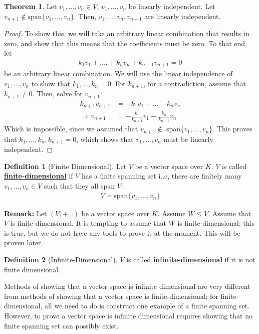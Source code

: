 \documentclass[11pt]{scrartcl}
\theoremstyle{definition}
\newtheorem{theorem}{Theorem}
\newtheorem{definition}{Definition}
\theoremstyle{remark}
\newcommand{\dfn}[1]{\textbf{\underline{#1}}}
\newcommand{\vsok}[0]{Let $(V, +, \cdot)$ be a vector space over $K$}
\begin{document}
\begin{theorem}
	Let $v_1, ..., v_n \in V$, $v_1, ..., v_n$ be linearly independent. Let $v_{n+1} \notin \text{span} \{ v_1, ..., v_n \}$. Then, $v_1, ..., v_n , v_{n+1}$ are linearly independent. 
\end{theorem}

\begin{proof}
	To show this, we will take an arbitrary linear combination that results in zero, and show that this means that the coefficients must be zero. To that end, let 
	\begin{align*}
		k_1 v_1 + .... + k_n v_n + k_{n+1} v_{n+1} = 0 
	\end{align*}
	be an arbitrary linear combination. We will use the linear independence of $v_1, ..., v_n$ to show that $k_1, ..., k_n = 0$. For $k_{n+1}$, for a contradiction, assume that $k_{n+1} \neq 0$. Then, solve for $v_{n+1}$: 
	\begin{align*}
		k_{n+1} v_{n+1} & = - k_1 v_1 - ... - k_n v_n \\
		\Rightarrow v_{n+1} & = - \frac{k_1}{k_{n+1}} v_1 - \frac{k_n}{k_{n+1}}v_n
	\end{align*}
	Which is impossible, since we assumed that $v_{n+1} \notin$ span$\{ v_1, ..., v_n \}$. This proves that $k_1, ..., k_n , k_{n+1} = 0$, which shows that $v_1, ..., v_n$ must be linearly independent. 
\end{proof}

\begin{definition}[Finite Dimensional] 
	Let $V$ be a vector space over $K$. $V$ is called \dfn{finite-dimensional} if $V$ has a finite spanning set i..e, there are finitely many $v_1, ..., v_n \in V$ such that they all span $V$: 
	\begin{align*}
		V = \text{span} \{ v_1 , ..., v_n \} 
	\end{align*}
\end{definition}

\textbf{Remark:} \vsok. Assume $W \leq V$. Assume that $V$ is finite-dimensional. It is tempting to assume that $W$ is finite-dimensional; this is true, but we do not have any tools to prove it at the moment. This will be proven later. 

\begin{definition}[Infinite-Dimensional]
	$V$ is called \dfn{infinite-dimensional} if it is not finite dimensional. 
\end{definition}
Methods of showing that a vector space is infinite dimensional are very different from methods of showing that a vector space is finite-dimensional; for finite-dimensional, all we need to do is construct one example of a finite spanning set. However, to prove a vector space is infinite dimensional requires showing that no finite spanning set can possibly exist. 
\end{document}

